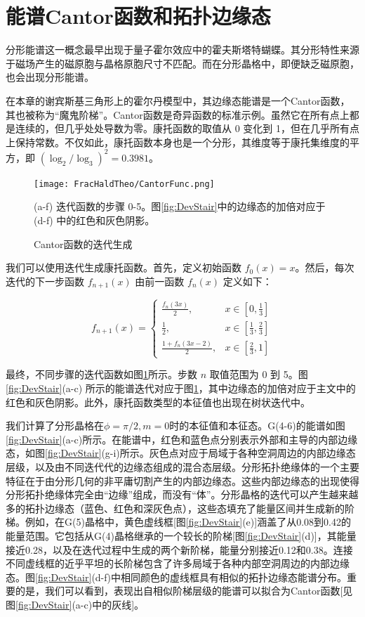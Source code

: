 \section{能谱Cantor函数和拓扑边缘态}
分形能谱这一概念最早出现于量子霍尔效应中的霍夫斯塔特蝴蝶\cite{hofstadter1976energy}。其分形特性来源于磁场产生的磁原胞与晶格原胞尺寸不匹配。而在分形晶格中，即便缺乏磁原胞，也会出现分形能谱。

在本章的谢宾斯基三角形上的霍尔丹模型中，其边缘态能谱是一个Cantor函数，其也被称为“魔鬼阶梯”。Cantor函数是奇异函数的标准示例。虽然它在所有点上都是连续的，但几乎处处导数为零。康托函数的取值从 0 变化到 1，但在几乎所有点上保持常数。不仅如此，康托函数本身也是一个分形，其维度等于康托集维度的平方\cite{darst1993hausdorff}，即 $(\log_2/\log_3)^2 = 0.3981$。
\begin{figure}[htbp]
    \centering
    \texttt{[image: FracHaldTheo/CantorFunc.png]}
    \caption{Cantor函数的迭代生成}(a-f) 迭代函数的步骤 0-5。图\ref{fig:DevStair}中的边缘态的加倍对应于 (d-f) 中的红色和灰色阴影。
    \label{fig:CantorFunc}
\end{figure}
我们可以使用迭代生成康托函数\cite{dovgoshey2006cantor}。首先，定义初始函数 $f_0(x) = x$。然后，每次迭代的下一步函数 $f_{n+1}(x)$ 由前一函数 $f_n(x)$ 定义如下：

\begin{equation}
f_{n+1}(x) =
\begin{cases}
\frac{f_n(3x)}{2}, & x \in \left[0, \frac{1}{3}\right] \\
\frac{1}{2}, & x \in \left[\frac{1}{3}, \frac{2}{3}\right] \\
\frac{1 + f_n(3x - 2)}{2}, & x \in \left[\frac{2}{3}, 1\right]
\end{cases}
\end{equation}

最终，不同步骤的迭代函数如图\ref{fig:CantorFunc}所示。步数 $n$ 取值范围为 0 到 5。图\ref{fig:DevStair}(a-c) 所示的能谱迭代对应于图\ref{fig:CantorFunc}，其中边缘态的加倍对应于主文中的红色和灰色阴影。此外，康托函数类型的本征值也出现在树状迭代中\cite{he2003trees}。

我们计算了分形晶格在$\phi=\pi/2,m=0$时的本征值和本征态。G(4-6)的能谱如图\ref{fig:DevStair}(a-c)所示。在能谱中，红色和蓝色点分别表示外部和主导的内部边缘态，如图\ref{fig:DevStair}(g-i)所示。灰色点对应于局域于各种空洞周边的内部边缘态层级，以及由不同迭代代的边缘态组成的混合态层级。分形拓扑绝缘体的一个主要特征在于由分形几何的非平庸切割产生的内部边缘态。这些内部边缘态的出现使得分形拓扑绝缘体完全由“边缘”组成，而没有“体”\cite{yang2020photonic,biesenthal2022fractal}。分形晶格的迭代可以产生越来越多的拓扑边缘态（蓝色、红色和深灰色点），这些态填充了能量区间并生成新的阶梯。例如，在G(5)晶格中，黄色虚线框[图\ref{fig:DevStair}(e)]涵盖了从0.08到0.42的能量范围。它包括从G(4)晶格继承的一个较长的阶梯[图\ref{fig:DevStair}(d)]，其能量接近0.28，以及在迭代过程中生成的两个新阶梯，能量分别接近0.12和0.38。连接不同虚线框的近乎平坦的长阶梯包含了许多局域于各种内部空洞周边的内部边缘态。图\ref{fig:DevStair}(d-f)中相同颜色的虚线框具有相似的拓扑边缘态能谱分布。重要的是，我们可以看到，表现出自相似阶梯层级的能谱可以拟合为Cantor函数\cite{Mandelbrot1982,bak1986devil}[见图\ref{fig:DevStair}(a-c)中的灰线]。 

